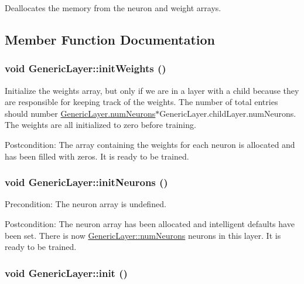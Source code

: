 Deallocates the memory from the neuron and weight arrays. 

\subsection{Member Function Documentation}
\hypertarget{classGenericLayer_2e2e170339c48bbcfe05afe9a1f60e43}{
\subsubsection{\setlength{\rightskip}{0pt plus 5cm}void GenericLayer::initWeights ()}}
\label{classGenericLayer_2e2e170339c48bbcfe05afe9a1f60e43}


Initialize the weights array, but only if we are in a layer with a child because they are responsible for keeping track of the weights. The number of total entries should number \hyperlink{classGenericLayer_7b45631903aa50e67fe5a1947fc292bd}{GenericLayer.numNeurons}$\ast$GenericLayer.childLayer.numNeurons. The weights are all initialized to zero before training. \begin{Desc}
\item[Postcondition:]The array containing the weights for each neuron is allocated and has been filled with zeros. It is ready to be trained. \end{Desc}
\hypertarget{classGenericLayer_c9357145e80d180b812df7bddeb5139d}{
\subsubsection{\setlength{\rightskip}{0pt plus 5cm}void GenericLayer::initNeurons ()}}
\label{classGenericLayer_c9357145e80d180b812df7bddeb5139d}


\begin{Desc}
\item[Precondition:]The neuron array is undefined. \end{Desc}
\begin{Desc}
\item[Postcondition:]The neuron array has been allocated and intelligent defaults have been set. There is now \hyperlink{classGenericLayer_7b45631903aa50e67fe5a1947fc292bd}{GenericLayer::numNeurons} neurons in this layer. It is ready to be trained. \end{Desc}
\hypertarget{classGenericLayer_716fbf0e6e01271f9ae648dcf1bcccd9}{
\subsubsection{\setlength{\rightskip}{0pt plus 5cm}void GenericLayer::init ()}}
\label{classGenericLayer_716fbf0e6e01271f9ae648dcf1bcccd9}


